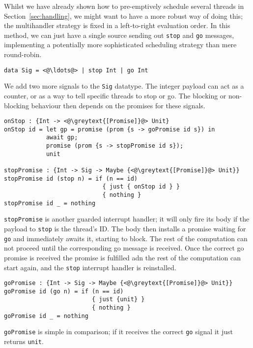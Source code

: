 \documentclass[msc,deptreport,cs]{infthesis} %
\newcommand{\code}[1]{\lstinline{#1}}
\newcommand{\greytext}[1]{\textcolor{black!40}{#1}}
\begin{document}

Whilst we have already shown how to pre-emptively schedule several threads in
Section~\ref{sec:handling}, we might want to have a more robust way of doing
this; the multihandler strategy is fixed in a left-to-right evaluation order. In
this method, we can just have a single source sending out \code{stop} and
\code{go} messages, implementing a potentially more sophisticated scheduling
strategy than mere round-robin.

\begin{lstlisting}
data Sig = <@\ldots@> | stop Int | go Int
\end{lstlisting}

We add two more signals to the \code{Sig} datatype. The integer payload can act
as a counter, or as a way to tell specific threads to stop or go. The blocking
or non-blocking behaviour then depends on the promises for these signals.

\begin{lstlisting}
onStop : {Int -> <@\greytext{[Promise]}@> Unit}
onStop id = let gp = promise (prom {s -> goPromise id s}) in
            await gp;
            promise (prom {s -> stopPromise id s});
            unit

stopPromise : {Int -> Sig -> Maybe {<@\greytext{[Promise]}@> Unit}}
stopPromise id (stop n) = if (n == id)
                            { just { onStop id } }
                            { nothing }
stopPromise id _ = nothing
\end{lstlisting}

\code{stopPromise} is another guarded interrupt handler; it will only fire its
body if the payload to \code{stop} is the thread's ID. The body then installs a
promise waiting for \code{go} and immediately awaits it, starting to block. The
rest of the computation can not proceed until the corresponding go message is
received. Once the correct go promise is received the promise is fulfilled adn
the rest of the computation can start again, and the \code{stop} interrupt
handler is reinstalled.

\begin{lstlisting}
goPromise : {Int -> Sig -> Maybe {<@\greytext{[Promise]}@> Unit}}
goPromise id (go n) = if (n == id)
                         { just {unit} }
                         { nothing }
goPromise id _ = nothing
\end{lstlisting}

\code{goPromise} is simple in comparison; if it receives the correct \code{go} signal
it just returns \code{unit}.
\end{document}
